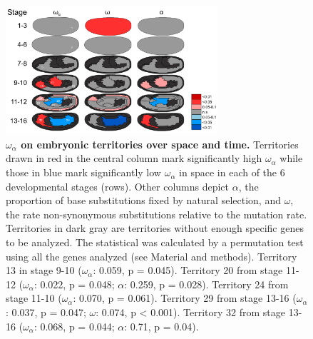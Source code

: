\begin{figure}[h]
  \includegraphics[width=0.7\textwidth]{./Images/Art-III/OmegaA_territories.png}
  \centering
  \caption{\textbf{$\omega_{\alpha}$ on embryonic territories over space and time.}
   Territories drawn in red in the central column mark significantly high $\omega_{\alpha}$ while those in blue mark significantly low $\omega_{\alpha}$ in space in each of the 6 developmental stages (rows). Other columns depict $\alpha$, the proportion of base substitutions fixed by natural selection, and $\omega$, the rate non-synonymous substitutions relative to the mutation rate. 
  Territories in dark gray are territories without enough specific genes to be analyzed. The statistical was calculated by a permutation test using all the genes analyzed (see Material and methods). Territory 13 in stage 9-10 ($\omega_{\alpha}$: 0.059, p = 0.045). Territory 20 from stage 11-12 ($\omega_{\alpha}$: 0.022, p = 0.048; $\alpha$: 0.259, p = 0.028). Territory 24 from stage 11-10 ($\omega_{\alpha}$: 0.070, p = 0.061). Territory 29 from stage 13-16 ($\omega_{\alpha}$: 0.037, p = 0.047; $\omega$: 0.074, p < 0.001). Territory 32 from stage 13-16 ($\omega_{\alpha}$: 0.068, p = 0.044; $\alpha$: 0.71, p = 0.04).
  }
  \label{fig:Art-III-OmegaA_territories}
\end{figure}


